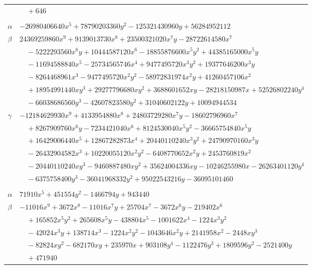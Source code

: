\documentclass[11pt]{article}
\begin{document}
\begin{longtable}{@{}ll@{}}
 & $\quad +646$\\
\addlinespace[3pt]
\multicolumn{2}{@{}l}{$\{i,j\}=\{22,30\}$, $k_{ij}=2^{4}\cdot 7^{4}$}\\
$\alpha$ & $-26980406640x^{5}+78790203360y^{2}-125321430960y+56284952112$\\
$\beta$ & $24369259860x^{9}+9139013730x^{8}+23500321020x^{7}y-28722614580x^{7}$\\
 & $\quad -5222293560x^{6}y+10444587120x^{6}-18855876600x^{5}y^{2}+44385165000x^{5}y$\\
 & $\quad -11694588840x^{5}-25734565746x^{4}+9477495720x^{3}y^{2}+19377646200x^{3}y$\\
 & $\quad -8264468961x^{3}-9477495720x^{2}y^{2}-58972831974x^{2}y+41260457106x^{2}$\\
 & $\quad +18954991440xy^{3}+29277796680xy^{2}+3688601652xy-28218150987x+52526802240y^{4}$\\
 & $\quad -66038686560y^{3}-42607823580y^{2}+31040602122y+10094944534$\\
$\gamma$ & $-12184629930x^{9}+4133954880x^{8}+24803729280x^{7}y-18602796960x^{7}$\\
 & $\quad +8267909760x^{6}y-7234421040x^{6}+8124530040x^{5}y^{2}-36665754840x^{5}y$\\
 & $\quad +16429006440x^{5}+12867282873x^{4}+20440110240x^{3}y^{2}+24790970160x^{3}y$\\
 & $\quad -26432904582x^{3}+10220055120x^{2}y^{2}-6408770652x^{2}y+2453760819x^{2}$\\
 & $\quad -20440110240xy^{3}-9460887480xy^{2}+35624004336xy-10246255980x-26263401120y^{4}$\\
 & $\quad -6375758400y^{3}-36041968332y^{2}+95022543216y-36095101460$\\
\addlinespace[3pt]
\multicolumn{2}{@{}l}{$\{i,j\}=\{23,37\}$, $k_{ij}=2^{3}\cdot 5\cdot 11$}\\
$\alpha$ & $71910x^{5}+451554y^{2}-1466794y+943440$\\
$\beta$ & $-11016x^{9}+3672x^{8}-11016x^{7}y+25704x^{7}-3672x^{6}y-219402x^{6}$\\
 & $\quad +165852x^{5}y^{2}+265608x^{5}y-438804x^{5}-1001622x^{4}-1224x^{3}y^{2}$\\
 & $\quad -42024x^{3}y+138714x^{3}-1224x^{2}y^{2}-1043646x^{2}y+2141958x^{2}-2448xy^{3}$\\
 & $\quad -82824xy^{2}-682170xy+235970x+903108y^{4}-1122476y^{3}+1809596y^{2}-2521400y$\\
 & $\quad +471940$\\

\end{longtable}
\end{document}
